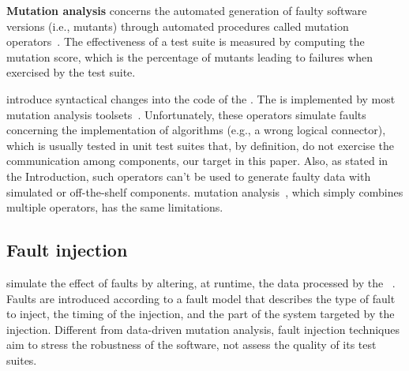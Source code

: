 \textbf{Mutation analysis} concerns the automated generation of faulty software versions (i.e., mutants) through automated procedures called mutation operators~\cite{jia2010analysis,papadakis2019mutation}. The effectiveness of a test suite is measured by computing the mutation score, which is the percentage of mutants leading to failures when exercised by the test suite.

 introduce syntactical changes into the code of the . The   is implemented by most mutation analysis toolsets~\cite{offutt1996experimental,rothermel1996experimental,andrews2005mutation,kintis2017detecting,offutt1996experimental}.
Unfortunately, these operators simulate faults concerning the implementation of algorithms (e.g., a wrong logical connector), which is usually tested in unit test suites that, by definition, do not exercise the communication among components, our target in this paper.
Also, as stated in the Introduction, such operators can't be used to generate faulty data with simulated or off-the-shelf components.
 mutation analysis~\cite{harman2010manifesto}, which simply combines multiple operators, has the same limitations.




\subsection{Fault injection}

 simulate the effect of faults by altering, at runtime, the data processed by the ~\cite{natella2016assessing}. Faults are introduced according to a fault model that describes the type of fault to inject, the timing of the injection, and the part of the system targeted by the injection. Different from data-driven mutation analysis, fault injection techniques aim to stress the robustness of the software,
not assess the quality of its test suites.



